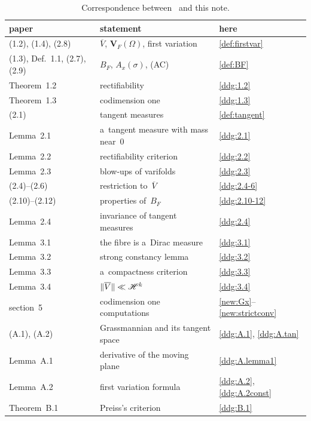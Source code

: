 \documentclass[a4paper,twoside,leqno]{article}
\begin{document}
\begin{table}[ht]
    \centering
    \small
    \begin{tabular}{lll}
        paper & statement & here \\ \hline
        (1.2), (1.4), (2.8) & $\overline V$, $\mathbf{V}_F(\Omega)$, first variation & \ref{def:firstvar} \\
        (1.3), Def.~1.1, (2.7), (2.9) & $B_F$, $A_x(\sigma)$, (AC) & \ref{def:BF} \\
        Theorem~1.2 & rectifiability & \ref{ddg:1.2} \\
        Theorem~1.3 & codimension one & \ref{ddg:1.3} \\
        (2.1) & tangent measures & \ref{def:tangent} \\
        Lemma~2.1 & a~tangent measure with mass near~$0$ & \ref{ddg:2.1} \\
        Lemma~2.2 & rectifiability criterion & \ref{ddg:2.2} \\
        Lemma~2.3 & blow-ups of varifolds & \ref{ddg:2.3} \\
        (2.4)--(2.6) & restriction to~$\overline V$ & \ref{ddg:2.4-6} \\
        (2.10)--(2.12) & properties of~$B_F$ & \ref{ddg:2.10-12} \\
        Lemma~2.4 & invariance of tangent measures & \ref{ddg:2.4} \\
        Lemma~3.1 & the fibre is a~Dirac measure & \ref{ddg:3.1} \\
        Lemma~3.2 & strong constancy lemma & \ref{ddg:3.2} \\
        Lemma~3.3 & a~compactness criterion & \ref{ddg:3.3} \\
        Lemma~3.4 & $\|\overline V\| \ll \mathscr{H}^{k}$ & \ref{ddg:3.4} \\
        section~5 & codimension one computations & \ref{new:Gx}--\ref{new:strictconv} \\
        (A.1), (A.2) & Grassmannian and its tangent space & \ref{ddg:A.1}, \ref{ddg:A.tan} \\
        Lemma~A.1 & derivative of the moving plane & \ref{ddg:A.lemma1} \\
        Lemma~A.2 & first variation formula & \ref{ddg:A.2}, \ref{ddg:A.2const} \\
        Theorem~B.1 & Preiss's criterion & \ref{ddg:B.1}
    \end{tabular}
    \caption{Correspondence between~\cite{DePhilippis2018} and this note.}
    \label{tab:correspondence}
\end{table}
\end{document}

